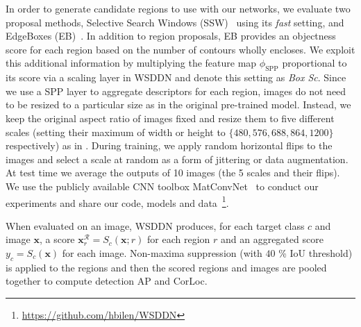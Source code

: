\documentclass[10pt,twocolumn,letterpaper]{article}
\newcommand{\bx}{\mathbf{x}}
\begin{document}
In order to generate candidate regions to use with our networks, we evaluate two proposal methods, Selective Search Windows (SSW)~\cite{Sande11} using its \textit{fast} setting, and EdgeBoxes (EB)~\cite{Zitnick14}. In addition to region proposals, EB provides an objectness score for each region based on the number of contours wholly encloses. We exploit this additional information by multiplying the feature map $\phi_{\text{SPP}}$ proportional to its score via a scaling layer in WSDDN and denote this setting as \emph{Box Sc}. Since we use a SPP layer to aggregate descriptors for each region, images do not need to be resized to a particular size as in the original pre-trained model. Instead, we keep the original aspect ratio of images fixed and resize them to five different scales (setting their maximum of width or height to $\lbrace 480,576,688,864,1200\rbrace$ respectively) as in \cite{He14}. During training, we apply random horizontal flips to the images and select a scale at random as a form of jittering or data augmentation. At test time we average the outputs of 10 images (\ie the 5 scales and their flips). We use the publicly available CNN toolbox MatConvNet~\cite{Vedaldi15} to conduct our experiments and share our code, models and data~\footnote{\url{https://github.com/hbilen/WSDDN}}.

When evaluated on an image, WSDDN produces, for each target class $c$ and image $\bx$, a score $\bx^\mathcal{R}_r = S_c(\bx;r)$ for each region $r$ and an aggregated score $y_c=S_c(\bx)$ for each image. Non-maxima suppression (with $40$ \% IoU threshold) is applied to the regions and then the scored regions and images are pooled together to compute detection AP and CorLoc.
\end{document}
